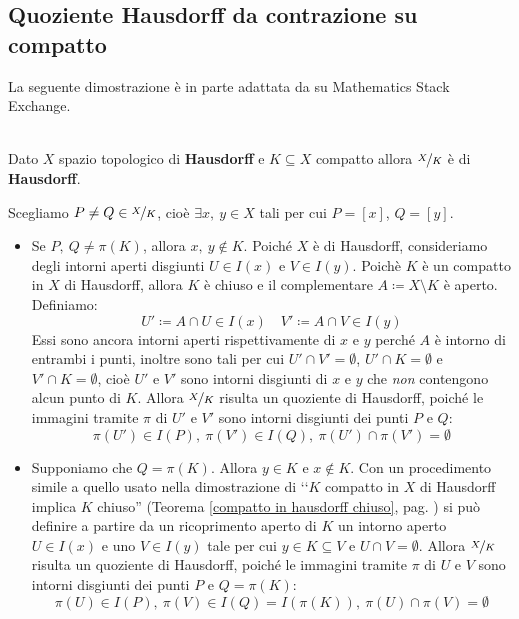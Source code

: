 \subsection{Quoziente Hausdorff da contrazione su compatto}
La seguente dimostrazione è in parte adattata da \cite{user:hausdorff} su Mathematics Stack Exchange.
\begin{lemming}~{}\\
	Dato $X$ spazio topologico di \textbf{Hausdorff} e $K\subseteq X$ compatto allora $\nicefrac{X}{K}$ è di \textbf{Hausdorff}.
\end{lemming}
\begin{demonstration}
	Scegliamo $P\neq Q\in \nicefrac{X}{K}$, cioè $\exists x,\ y\in X$ tali per cui $P=[x]$, $Q=[y]$.
	\begin{itemize}
		\item Se $P,\ Q\neq \pi\left(K\right)$, allora $x,\ y\notin K$. Poiché $X$ è di Hausdorff, consideriamo degli intorni aperti disgiunti $U\in I\left(x\right)$ e $V\in I\left(y\right)$. Poichè $K$ è un compatto in $X$ di Hausdorff, allora $K$ è chiuso e il complementare $A\coloneqq X\setminus K$ è aperto. Definiamo:
		\begin{equation*}
			U'\coloneqq A\cap U\in I\left(x\right)\quad V'\coloneqq A\cap V\in I\left(y\right)
		\end{equation*}
		Essi sono ancora intorni aperti rispettivamente di $x$ e $y$ perché $A$ è intorno di entrambi i punti, inoltre sono tali per cui $U'\cap V'=\emptyset$, $U'\cap K=\emptyset$ e $V'\cap K=\emptyset$, cioè $U'$ e $V'$ sono intorni disgiunti di $x$ e $y$ che \textit{non} contengono alcun punto di $K$. Allora $\nicefrac{X}{K}$ risulta un quoziente di Hausdorff, poiché le immagini tramite $\pi$ di $U'$ e $V'$ sono intorni disgiunti dei punti $P$ e $Q$:
		\begin{equation*}
			\pi\left(U'\right)\in I\left(P\right),\ \pi\left(V'\right)\in I\left(Q\right),\ \pi\left(U'\right)\cap \pi\left(V'\right)=\emptyset
		\end{equation*}
		\item Supponiamo che $Q=\pi\left(K\right)$. Allora $y\in K$ e $x\notin K$. Con un procedimento simile a quello usato nella dimostrazione di ‘‘$K$ compatto in $X$ di Hausdorff implica $K$ chiuso'' (Teorema \ref{compatto in hausdorff chiuso}, pag. \pageref{compatto in hausdorff chiuso}) si può definire a partire da un ricoprimento aperto di $K$ un intorno aperto $U\in I\left(x\right)$ e uno $V\in I\left(y\right)$ tale per cui $y\in K\subseteq V$ e $U\cap V=\emptyset$. Allora $\nicefrac{X}{K}$ risulta un quoziente di Hausdorff, poiché le immagini tramite $\pi$ di $U$ e $V$ sono intorni disgiunti dei punti $P$ e $Q=\pi\left(K\right)$:
		\begin{equation*}
			\pi\left(U\right)\in I\left(P\right),\ \pi\left(V\right)\in I\left(Q\right)=I\left(\pi\left(K\right)\right),\ \pi\left(U\right)\cap \pi\left(V\right)=\emptyset
		\end{equation*}
	\end{itemize}
\vspace{-6mm}
\end{demonstration}
\label{quozientehausdorffsuspaziocompatto}
